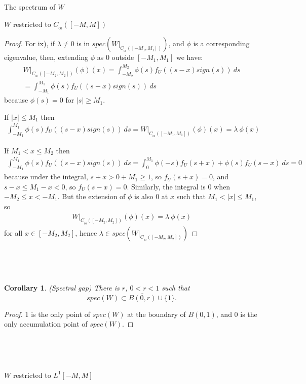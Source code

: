 \documentclass[12pt]{article}
\newtheorem{corollary}[theorem]{Corollary}
\begin{document}
\begin{section}{The spectrum of $W$ }
\begin{subsection}{$W$ restricted to $C_{_{0\!0}}([-M,M])$}
\begin{proof}
For ix), if $\lambda \ne 0$ is in $spec(W\Big|_{C_{_{00}}([-M_1,M_1])})$, and $\phi$ is a corresponding eigenvalue, then, extending  $\phi$ as $0$ outside $[-M_1,M_1]$ we have:
\begin{align*}
W\Big|_{C_{_{00}}([-M_2,M_2])}(\phi)(x) = \int_{-M_2}^{M_2} \phi(s) f_U\!( (s-x)sign(s)) \ ds \\
= \int_{-M_1}^{M_1} \phi(s) f_U\!( (s-x)sign(s)) \ ds
\end{align*}
because $\phi(s) = 0$ for $|s| \ge M_1$. 

If $|x| \le M_1$ then 
\begin{align*}
 \int_{-M_1}^{M_1} \phi(s) f_U\!( (s-x)sign(s)) \ ds = W\Big|_{C_{_{00}}([-M_1,M_1])}(\phi)(x) = \lambda \ \phi(x)
\end{align*}

If $M_1 < x \le M_2$ then 
\begin{align*}
\int_{-M_1}^{M_1} \phi(s) f_U\!( (s-x)sign(s)) \ ds = 
\int_{0}^{M_1} \phi(-s) f_U\!( s+x) + \phi(s) f_U\!( s-x) \ ds = 0
\end{align*}
because under the integral, $s+x > 0 + M_1 \ge 1$, so $f_U\!(s+x)=0$, and $s-x \le M_1 - x < 0$, so $f_U\!( s-x)=0$. Similarly, the integral is $0$ when $-M_2 \le x < -M_1$. But the extension of $\phi$ is also $0$ at $x$ such that $M_1 < |x| \le M_1$, so 
\begin{align*}
W\Big|_{C_{_{00}}([-M_2,M_2])}(\phi)(x) = \lambda \ \phi(x)
\end{align*} 
for all $x \in [-M_2,M_2]$, hence $\lambda \in spec(W\Big|_{C_{_{00}}([-M_2,M_2])})$\endproof
\end{proof}

\

\

\begin{corollary}{(Spectral gap)} There is $r$, $0 < r < 1$ such that
	$$
	spec(W) \subset \overline{B(0,r)} \cup \{1\} .
	$$ 
\end{corollary}
\begin{proof}
$1$ is the only point of $spec(W)$ at the boundary of $B(0,1)$, and $0$ is the only accumulation point of $spec(W)$.\endproof
\end{proof}
\

\

\end{subsection}

\begin{subsection}{$W$ restricted to $L^1[-M,M]$ }
\label{subsec:L1spec}


\end{subsection}
\end{section}
\end{document}
